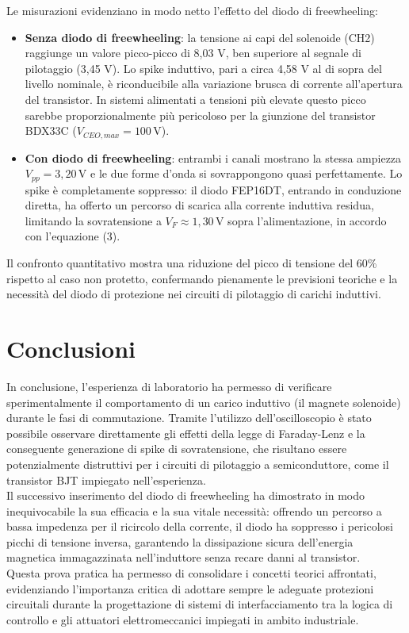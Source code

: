 \documentclass{article}
\begin{document}
    Le misurazioni evidenziano in modo netto l'effetto del diodo di freewheeling:

    \begin{itemize}
        \item \textbf{Senza diodo di freewheeling}: la tensione ai capi del solenoide (CH2) raggiunge un valore picco-picco di 8,03 V,
            ben superiore al segnale di pilotaggio (3,45 V). Lo spike induttivo, pari a circa 4,58 V al di sopra del livello nominale, è
            riconducibile alla variazione brusca di corrente all'apertura del transistor. In sistemi alimentati a tensioni più elevate
            questo picco sarebbe proporzionalmente più pericoloso per la giunzione del transistor BDX33C ($V_{CEO,max} = 100\,\text{V}$).
        \item \textbf{Con diodo di freewheeling}: entrambi i canali mostrano la stessa ampiezza $V_{pp} = 3{,}20\,\text{V}$ e le due forme
            d'onda si sovrappongono quasi perfettamente. Lo spike è completamente soppresso: il diodo FEP16DT, entrando in conduzione diretta,
            ha offerto un percorso di scarica alla corrente induttiva residua, limitando la sovratensione a $V_F \approx 1{,}30\,\text{V}$ sopra
            l'alimentazione, in accordo con l'equazione (3).
    \end{itemize}

    \noindent Il confronto quantitativo mostra una riduzione del picco di tensione del 60\% rispetto al caso non protetto, confermando pienamente
    le previsioni teoriche e la necessità del diodo di protezione nei circuiti di pilotaggio di carichi induttivi.
    
    \newpage

\section{Conclusioni}
    In conclusione, l'esperienza di laboratorio ha permesso di verificare sperimentalmente il comportamento di un carico induttivo (il magnete solenoide)
    durante le fasi di commutazione. Tramite l'utilizzo dell'oscilloscopio è stato possibile osservare direttamente gli effetti della legge di Faraday-Lenz
    e la conseguente generazione di spike di sovratensione, che risultano essere potenzialmente distruttivi per i circuiti di pilotaggio a semiconduttore,
    come il transistor BJT impiegato nell'esperienza. \\

    \noindent Il successivo inserimento del diodo di freewheeling ha dimostrato in modo inequivocabile la sua efficacia e la sua vitale necessità: offrendo
    un percorso a bassa impedenza per il ricircolo della corrente, il diodo ha soppresso i pericolosi picchi di tensione inversa, garantendo la dissipazione
    sicura dell'energia magnetica immagazzinata nell'induttore senza recare danni al transistor. \\

    \noindent Questa prova pratica ha permesso di consolidare i concetti teorici affrontati, evidenziando l'importanza critica di adottare sempre le adeguate
    protezioni circuitali durante la progettazione di sistemi di interfacciamento tra la logica di controllo e gli attuatori elettromeccanici impiegati in ambito industriale.
\newpage
\end{document}
